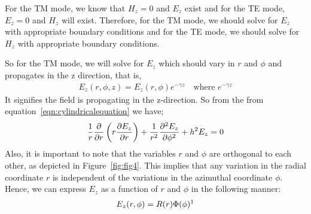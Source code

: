 For the TM mode, we know that $H_z=0$ and $E_z$ exist and for the TE mode, $E_z=0$ and $H_z$ will exist. Therefore, for the TM mode, we should solve for $E_z$ with appropriate boundary conditions and for the TE mode, we should solve for $H_z$ with appropriate boundary conditions. 

So for the TM mode, we will solve for $E_z$ which should vary in $r$ and $\phi$ and propagates in the z direction, that is,
\begin{align*}
E_z(r,\phi, z)=E_z(r,\phi)e^{-\gamma z}\quad\text{where }e^{-\gamma z}
\end{align*}
It signifies the field is propagating in the z-direction. So from the from equation~\eqref{eqn:cylindricalequation} we have;
\begin{equation}
\frac{1}{r}\partialderivative{}{r}\left(r\partialderivative{E_z}{r}\right) + \frac{1}{r^2}\partialderivative[2]{E_z}{\phi} + h^2 E_z = 0 
\label{eqn:pdecircularwaveguide}
\end{equation}
Also, it is important to note that the variables $r$ and $\phi$ are orthogonal to each other, as depicted in Figure~\ref{fig:fig4}. This implies that any variation in the radial coordinate $r$ is independent of the variations in the azimuthal coordinate $\phi$. Hence, we can express $E_z$ as a function of $r$ and $\phi$ in the following manner:
\begin{align*}
E_z(r, \phi) = R(r)\Phi(\phi)\footnotemark
\end{align*}

